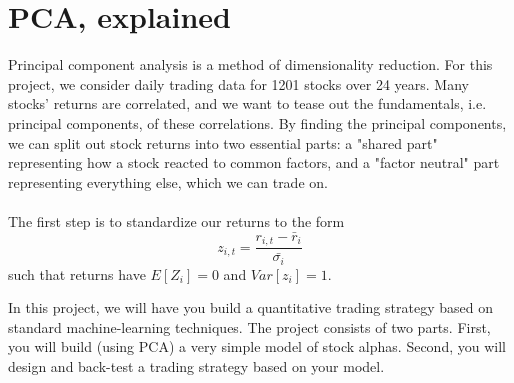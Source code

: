 \documentclass[12pt,letterpaper]{article}
\begin{document}
\section{PCA, explained}
Principal component analysis is a method of dimensionality reduction. For this project, we consider daily trading data for 1201 stocks over 24 years. Many stocks' returns are correlated, and we want to tease out the fundamentals, i.e. principal components, of these correlations. By finding the principal components, we can split out stock returns into two essential parts: a "shared part" representing how a stock reacted to common factors, and a "factor neutral" part representing everything else, which we can trade on. 
\\
\\
The first step is to standardize our returns to the form 
$$z_{i,t}=\frac{r_{i,t}-\bar{r}_i}{\bar{\sigma_i}}$$
such that returns have $E[Z_i]=0$ and $Var[z_i]=1$.



\newpage
In this project, we will have you build a quantitative trading strategy based
on standard machine-learning techniques. The project consists of two parts.
First, you will build (using PCA) a very simple model of stock alphas.
Second, you will design and back-test a trading strategy based on your model.
\end{document}
